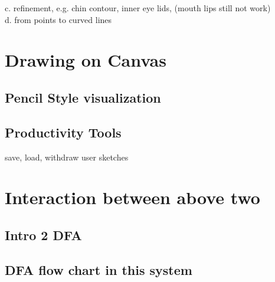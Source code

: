 						c. refinement, e.g. chin contour, inner eye lids, (mouth lips still not work) \\
							
						d. from points to curved lines \\

			
							
\section{Drawing on Canvas}
	
		\subsection{Pencil Style visualization}
			
		\subsection{Productivity Tools}
					save, load, withdraw user sketches
			
					
					
\section{Interaction between above two}

		\subsection{Intro 2 DFA}
		
		\subsection{DFA flow chart in this system}



